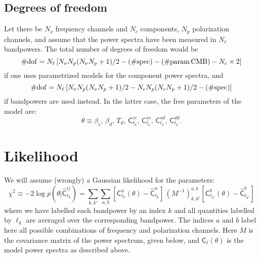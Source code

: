 \documentclass[a4paper,10pt]{article}
\begin{document}
\subsection{Degrees of freedom}
Let there be $N_\nu$ frequency channels and $N_c$ components, $N_p$ polarization channels, and assume that the power
spectra have been measured in $N_\ell$ bandpowers. The total number of degrees of freedom would be
\begin{equation}
  \#{\rm dof}=N_\ell\left[N_\nu N_p(N_\nu N_p+1)/2-(\#{\rm spec})-(\#{\rm param\,CMB})-N_c\times2\right]
\end{equation}
if one uses parametrized models for the component power spectra, and
\begin{equation}
  \#{\rm dof}=N_\ell\left[N_\nu N_p(N_\nu N_p+1)/2-N_c N_p(N_c N_p+1)/2-(\#{\rm spec})\right]
\end{equation}
if bandpowers are used instead. In the latter case, the free parameters of the model are:
\begin{equation}
  \theta\equiv\beta_s,\,\beta_d,\,T_d,\,\mathsf{C}^{cc}_{\ell_k},\,\mathsf{C}^{ss}_{\ell_k},\,\mathsf{C}^{sd}_{\ell_k},\,\mathsf{C}^{dd}_{\ell_k}.
\end{equation}


\section{Likelihood}
We will assume (wrongly) a Gaussian likelihood for the parameters:
\begin{equation}
 \chi^2\equiv-2\log p(\theta|\hat{\mathsf{C}}^{ij}_{\ell_k})=\sum_{k,k'}\sum_{a,b}
 [\mathsf{C}^{a}_{\ell_k}(\theta)-\hat{\mathsf{C}}^{a}_{\ell_k}]\,(M^{-1})^{a,b}_{k,k'}
 [\mathsf{C}^{b}_{\ell_{k'}}(\theta)-\hat{\mathsf{C}}^{b}_{\ell_{k'}}]
\end{equation}
where we have labelled each bandpower by an index $k$ and all quantities labelled by ${\ell_k}$ are averaged over the corresponding
bandpower. The indices $a$ and $b$ label here all possible combinations of frequency and polarization channels. Here $M$ is the
covariance matrix of the power spectrum, given below, and $\mathsf{C}_\ell(\theta)$ is the model power spectra
as described above.
\end{document}
